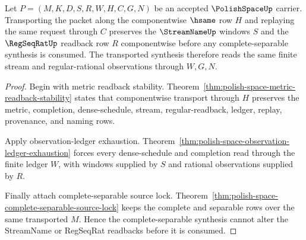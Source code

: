 \begin{theorem}
\label{thm:polish-space-stream-readback-stability}
Let $P=(M,K,D,S,R,W,H,C,G,N)$ be an accepted $\PolishSpaceUp$ carrier. Transporting the packet along the componentwise $\hsame$ row $H$ and replaying the same request through $C$ preserves the $\StreamNameUp$ windows $S$ and the $\RegSeqRatUp$ readback row $R$ componentwise before any complete-separable synthesis is consumed. The transported synthesis therefore reads the same finite stream and regular-rational observations through $W,G,N$.
\end{theorem}
\begin{proof}
Begin with metric readback stability. Theorem~\ref{thm:polish-space-metric-readback-stability} states that componentwise transport through $H$ preserves the metric, completion, dense-schedule, stream, regular-readback, ledger, replay, provenance, and naming rows.

Apply observation-ledger exhaustion. Theorem~\ref{thm:polish-space-observation-ledger-exhaustion} forces every dense-schedule and completion read through the finite ledger $W$, with windows supplied by $S$ and rational observations supplied by $R$.

Finally attach complete-separable source lock. Theorem~\ref{thm:polish-space-complete-separable-source-lock} keeps the complete and separable rows over the same transported $M$. Hence the complete-separable synthesis cannot alter the StreamName or RegSeqRat readbacks before it is consumed.
\end{proof}

